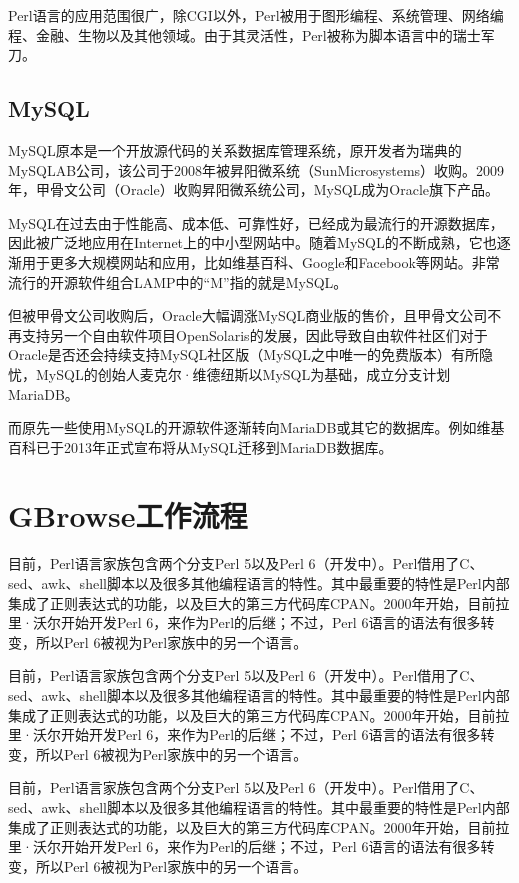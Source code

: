 		Perl语言的应用范围很广，除CGI以外，Perl被用于图形编程、系统管理、网络编程、金融、生物以及其他领域。由于其灵活性，Perl被称为脚本语言中的瑞士军刀。
		\subsection{MySQL}
		MySQL原本是一个开放源代码的关系数据库管理系统，原开发者为瑞典的MySQLAB公司，该公司于2008年被昇阳微系统（SunMicrosystems）收购。2009年，甲骨文公司（Oracle）收购昇阳微系统公司，MySQL成为Oracle旗下产品。
		
		MySQL在过去由于性能高、成本低、可靠性好，已经成为最流行的开源数据库，因此被广泛地应用在Internet上的中小型网站中。随着MySQL的不断成熟，它也逐渐用于更多大规模网站和应用，比如维基百科、Google和Facebook等网站。非常流行的开源软件组合LAMP中的“M”指的就是MySQL。
		
		但被甲骨文公司收购后，Oracle大幅调涨MySQL商业版的售价，且甲骨文公司不再支持另一个自由软件项目OpenSolaris的发展，因此导致自由软件社区们对于Oracle是否还会持续支持MySQL社区版（MySQL之中唯一的免费版本）有所隐忧，MySQL的创始人麦克尔·维德纽斯以MySQL为基础，成立分支计划MariaDB。
		
		而原先一些使用MySQL的开源软件逐渐转向MariaDB或其它的数据库。例如维基百科已于2013年正式宣布将从MySQL迁移到MariaDB数据库。
	\section{GBrowse工作流程}
	目前，Perl语言家族包含两个分支Perl 5以及Perl 6（开发中）。Perl借用了C、sed、awk、shell脚本以及很多其他编程语言的特性。其中最重要的特性是Perl内部集成了正则表达式的功能，以及巨大的第三方代码库CPAN。2000年开始，目前拉里·沃尔开始开发Perl 6，来作为Perl的后继；不过，Perl 6语言的语法有很多转变，所以Perl 6被视为Perl家族中的另一个语言。
	
	目前，Perl语言家族包含两个分支Perl 5以及Perl 6（开发中）。Perl借用了C、sed、awk、shell脚本以及很多其他编程语言的特性。其中最重要的特性是Perl内部集成了正则表达式的功能，以及巨大的第三方代码库CPAN。2000年开始，目前拉里·沃尔开始开发Perl 6，来作为Perl的后继；不过，Perl 6语言的语法有很多转变，所以Perl 6被视为Perl家族中的另一个语言。
	
	目前，Perl语言家族包含两个分支Perl 5以及Perl 6（开发中）。Perl借用了C、sed、awk、shell脚本以及很多其他编程语言的特性。其中最重要的特性是Perl内部集成了正则表达式的功能，以及巨大的第三方代码库CPAN。2000年开始，目前拉里·沃尔开始开发Perl 6，来作为Perl的后继；不过，Perl 6语言的语法有很多转变，所以Perl 6被视为Perl家族中的另一个语言。
	
